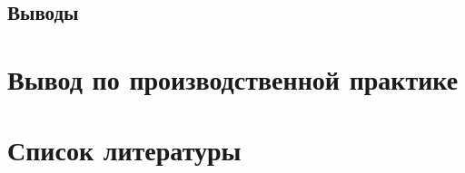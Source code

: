 \documentclass{article}
\begin{document}
		\subsection{Выводы}
	\newpage
	\section{Вывод по производственной практике}
	\newpage
	\section{Список литературы}
\end{document}

